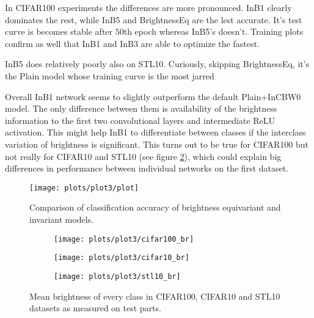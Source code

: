     In CIFAR100 experiments the differences are more pronounced. InB1 clearly
    dominates the rest, while InB5 and BrightnessEq are the lest accurate.
    It's test curve is becomes stable after $50$th epoch whereas InB5's doesn't.
    Training plots confirm as well that InB1 and InB3 are able to optimize the
    fastest.

    InB5 does relatively poorly also on STL10. Curiously, skipping BrightnessEq,
    it's the Plain model whose training curve is the most jarred

    Overall InB1 network seems to slightly outperform the default Plain+InCBW0
    model.
    The only difference between them is availability of the
    brightness information to the first two convolutional layers and
    intermediate ReLU activation. This might help InB1 to differentiate between
    classes if the interclass variation of brightness is significant. This
    turns out to be true
    for CIFAR100 but not really for CIFAR10 and STL10 (see figure
    \ref{fig:plot3brightness}), which could explain big differences in
    performance between individual networks on the first dataset.



    \begin{figure}[h!]
        \centering
        \texttt{[image: plots/plot3/plot]}
        \caption{Comparison of classification accuracy of
        brightness equivariant and invariant models.}
        \label{fig:plot3}
    \end{figure}

    \begin{figure}[h!]
        \centering
        \begin{subfigure}{0.7\textwidth}
            \texttt{[image: plots/plot3/cifar100\_br]}
        \end{subfigure}
        \begin{subfigure}{0.45\textwidth}
            \texttt{[image: plots/plot3/cifar10\_br]}
        \end{subfigure}
        \begin{subfigure}{0.45\textwidth}
            \texttt{[image: plots/plot3/stl10\_br]}
        \end{subfigure}
        \caption{Mean brightness of every class in CIFAR100, CIFAR10 and STL10
            datasets as measured on test parts.}
        \label{fig:plot3brightness}
    \end{figure}

